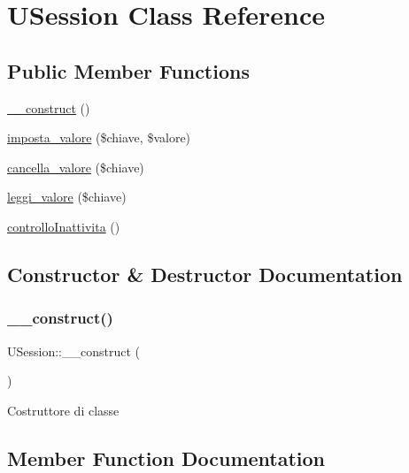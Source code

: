 \hypertarget{class_u_session}{}\section{U\+Session Class Reference}
\label{class_u_session}
\subsection*{Public Member Functions}
\begin{DoxyCompactItemize}
\item 
\mbox{\hyperlink{class_u_session_ace1a86e07cb70f9db476a38db7bd762c}{\+\_\+\+\_\+construct}} ()
\item 
\mbox{\hyperlink{class_u_session_a213a0df57361fd27ce1d2db70984231a}{imposta\+\_\+valore}} (\$chiave, \$valore)
\item 
\mbox{\hyperlink{class_u_session_ad7e05d832145fffe2471f25572ae0555}{cancella\+\_\+valore}} (\$chiave)
\item 
\mbox{\hyperlink{class_u_session_ab4782ddc56b131196d726a564272dfec}{leggi\+\_\+valore}} (\$chiave)
\item 
\mbox{\hyperlink{class_u_session_a4fa4bb16e229791f09ece2af558a0549}{controllo\+Inattivita}} ()
\end{DoxyCompactItemize}


\subsection{Constructor \& Destructor Documentation}
\mbox{\label{class_u_session_ace1a86e07cb70f9db476a38db7bd762c}} 
\subsubsection{\texorpdfstring{\+\_\+\+\_\+construct()}{\_\_construct()}}
{\footnotesize\ttfamily U\+Session\+::\+\_\+\+\_\+construct (\begin{DoxyParamCaption}{ }\end{DoxyParamCaption})}

Costruttore di classe 

\subsection{Member Function Documentation}
\mbox{\label{class_u_session_ad7e05d832145fffe2471f25572ae0555}} 
